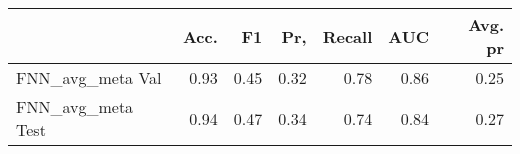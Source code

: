 \begin{tabular}{lrrrrrr}
\toprule
{} &  Acc. &    F1 &   Pr, &  Recall &   AUC &  Avg. pr \\
\midrule
FNN\_avg\_meta Val  &  0.93 &  0.45 &  0.32 &    0.78 &  0.86 &     0.25 \\
FNN\_avg\_meta Test &  0.94 &  0.47 &  0.34 &    0.74 &  0.84 &     0.27 \\
\bottomrule
\end{tabular}
